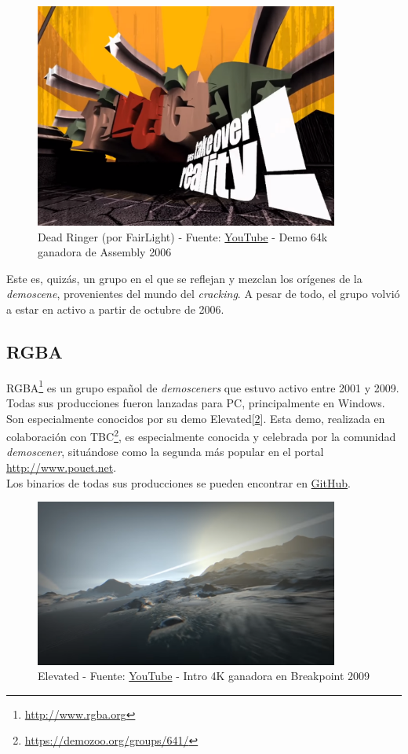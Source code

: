 \begin{figure}[h]
	\centering
	\includegraphics[width=10cm]{archivos/fairlight}
	\caption{Dead Ringer (por FairLight) - Fuente: \href{https://www.youtube.com/watch?v=Mc_TR4mcJKE}{YouTube} - Demo 64k ganadora de Assembly 2006}
	\label{fig:fairlight}
\end{figure}

Este es, quizás, un grupo en el que se reflejan y mezclan los orígenes de la \emph{demoscene}, provenientes del mundo del \emph{cracking}. A pesar de todo, el grupo volvió a estar en activo a partir de octubre de 2006.

\subsection{RGBA}

RGBA\footnote{\url{http://www.rgba.org}} es un grupo español de \emph{demosceners} que estuvo activo entre 2001 y 2009. Todas sus producciones fueron lanzadas para PC, principalmente en Windows.\\

Son especialmente conocidos por su demo Elevated[\ref{fig:elevated}]. Esta demo, realizada en colaboración con TBC\footnote{\url{https://demozoo.org/groups/641/}}, es especialmente conocida y celebrada por la comunidad \emph{demoscener}, situándose como la segunda más popular en el portal \url{http://www.pouet.net}.\\

Los binarios de todas sus producciones se pueden encontrar en \href{https://github.com/reality3d/rgba-prods}{GitHub}.\\

\begin{figure}[h]
	\centering
	\includegraphics[width=10cm]{archivos/elevated}
	\caption{Elevated - Fuente: \href{https://www.youtube.com/watch?v=jB0vBmiTr6o}{YouTube} - Intro 4K ganadora en Breakpoint 2009}
	\label{fig:elevated}
\end{figure}

